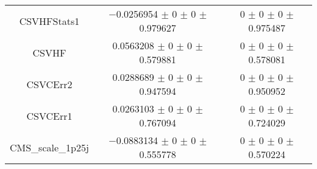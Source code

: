 \begin{table}
\begin{tabular}{ccc}
CSVHFStats1 & \num{-0.0256954} $\pm$ \num{0} $\pm$ \num{0} $\pm$ \num{0.979627} & \num{0} $\pm$ \num{0} $\pm$ \num{0} $\pm$ \num{0.975487}\\
CSVHF & \num{0.0563208} $\pm$ \num{0} $\pm$ \num{0} $\pm$ \num{0.579881} & \num{0} $\pm$ \num{0} $\pm$ \num{0} $\pm$ \num{0.578081}\\
CSVCErr2 & \num{0.0288689} $\pm$ \num{0} $\pm$ \num{0} $\pm$ \num{0.947594} & \num{0} $\pm$ \num{0} $\pm$ \num{0} $\pm$ \num{0.950952}\\
CSVCErr1 & \num{0.0263103} $\pm$ \num{0} $\pm$ \num{0} $\pm$ \num{0.767094} & \num{0} $\pm$ \num{0} $\pm$ \num{0} $\pm$ \num{0.724029}\\
CMS\_scale\_1p25j & \num{-0.0883134} $\pm$ \num{0} $\pm$ \num{0} $\pm$ \num{0.555778} & \num{0} $\pm$ \num{0} $\pm$ \num{0} $\pm$ \num{0.570224}\\
\bottomrule
\end{tabular}
\end{table}